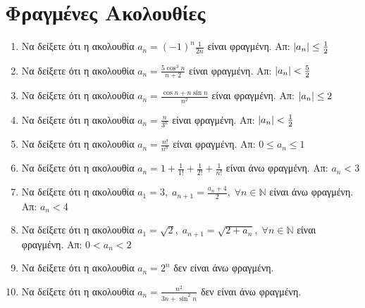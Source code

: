 \documentclass[a4paper,table]{report}
\begin{document}
\begin{center}
  \minibox[c]{\large \bfseries \textcolor{Col1}{Ακολουθίες}\\ \large 
  \textcolor{Col1}{Ασκήσεις}}
\end{center}

\vspace{\baselineskip}


\setcounter{chapter}{1}
\section{Φραγμένες Ακολουθίες}

\begin{enumerate}
  \item Να δείξετε ότι η ακολουθία $ a_{n} = (-1)^{n}\frac{1}{2n} $ είναι 
    φραγμένη.
    \hfill Απ: $ \abs{a_{n}} \leq \frac{1}{2} $ 
  \item Να δείξετε ότι η ακολουθία $ a_{n} = \frac{5 \cos^{3}{n}}{n+2} $ 
    είναι φραγμένη.
    \hfill Απ: $ \abs{a_{n}} < \frac{5}{2}  $ 
  \item Να δείξετε ότι η ακολουθία $ a_{n} = \frac{\cos{n} + n \sin{n}}{n^{2}} $ 
    είναι φραγμένη. 
    \hfill Απ: $ \abs{a_{n}} \leq 2 $ 
  \item Να δείξετε ότι η ακολουθία $ a_{n} = \frac{n}{3^{n}} $ είναι 
    φραγμένη. 
    \hfill Απ: $ \abs{a_{n}}< \frac{1}{2} $
  \item Να δείξετε ότι η ακολουθία $ a_{n} = \frac{n!}{n^{n}} $ είναι 
    φραγμένη. 
    \hfill Απ: $ 0 \leq a_{n} \leq 1 $ 
  \item Να δείξετε ότι η ακολουθία $ a_{n} = 1 + \frac{1}{1!} +
    \frac{1}{2!} + \frac{1}{n!} $ είναι άνω φραγμένη.
    \hfill Απ: $ a_{n} < 3 $ 
  \item Να δείξετε ότι η ακολουθία $ a_{1} = 3, \; a_{n+1} =
    \frac{a_{n}+4}{2}, \; \forall n \in \mathbb{N} $ είναι άνω φραγμένη.
    \hfill Απ: $ a_{n} < 4 $ 
  \item Να δείξετε ότι η ακολουθία $ a_{1} = \sqrt{2}, \; a_{n+1} =
    \sqrt{2+ a_{n}}, \; \forall n \in \mathbb{N} $ είναι φραγμένη.
    \hfill Απ: $ 0 < a_{n} < 2$ 
  \item Να δείξετε ότι η ακολουθία $ a_{n} = 2^{n} $ δεν είναι άνω 
    φραγμένη.
  \item Να δείξετε ότι η ακολουθία $ a_{n} = \frac{n^{2}}{3n+ \sin^{2}{n}} $ δεν 
    είναι άνω φραγμένη.
\end{enumerate}
\end{document}
